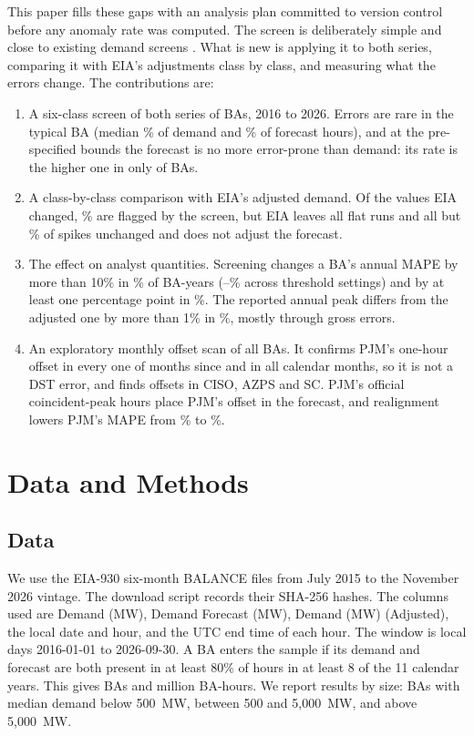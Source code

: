 \documentclass[conference,a4paper]{IEEEtran}
\begin{document}
This paper fills these gaps with an analysis plan committed to version control before any anomaly rate was computed. The screen is deliberately simple and close to existing demand screens \cite{ruggles2020eia,pudl}. What is new is applying it to both series, comparing it with EIA's adjustments class by class, and measuring what the errors change. The contributions are:
\begin{enumerate}
\item A six-class screen of both series of  BAs, 2016 to 2026. Errors are rare in the typical BA (median \% of demand and \% of forecast hours), and at the pre-specified bounds the forecast is no more error-prone than demand: its rate is the higher one in only  of  BAs.
\item A class-by-class comparison with EIA's adjusted demand. Of the values EIA changed, \% are flagged by the screen, but EIA leaves all flat runs and all but \% of spikes unchanged and does not adjust the forecast.
\item The effect on analyst quantities. Screening changes a BA's annual MAPE by more than 10\% in \% of BA-years (--\% across  threshold settings) and by at least one percentage point in \%. The reported annual peak differs from the adjusted one by more than 1\% in \%, mostly through gross errors.
\item An exploratory monthly offset scan of all BAs. It confirms PJM's one-hour offset \cite{guerrafilho2026scorecard} in every one of  months since  and in all calendar months, so it is not a DST error, and finds offsets in CISO, AZPS and SC. PJM's official coincident-peak hours place PJM's offset in the forecast, and realignment lowers PJM's MAPE from \% to \%.
\end{enumerate}

\section{Data and Methods}

\subsection{Data}
We use the EIA-930 six-month BALANCE files from July 2015 to the November 2026 vintage. The download script records their SHA-256 hashes. The columns used are Demand (MW), Demand Forecast (MW), Demand (MW) (Adjusted), the local date and hour, and the UTC end time of each hour. The window is local days 2016-01-01 to 2026-09-30. A BA enters the sample if its demand and forecast are both present in at least 80\% of hours in at least 8 of the 11 calendar years. This gives  BAs and  million BA-hours. We report results by size:  BAs with median demand below 500~MW,  between 500 and 5{,}000~MW, and  above 5{,}000~MW.
\end{document}
